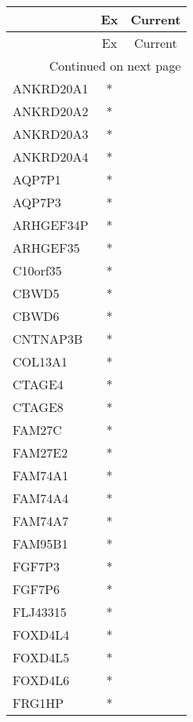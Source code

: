 \begin{longtable}{lcc}
\toprule
{} & Ex & Current \\
\midrule
\endfirsthead

\toprule
{} & Ex & Current \\
\midrule
\endhead
\midrule
\multicolumn{3}{r}{{Continued on next page}} \\
\midrule
\endfoot

\bottomrule
\endlastfoot
ANKRD20A1          &  * &         \\
ANKRD20A2          &  * &         \\
ANKRD20A3          &  * &         \\
ANKRD20A4          &  * &         \\
AQP7P1             &  * &         \\
AQP7P3             &  * &         \\
ARHGEF34P          &  * &         \\
ARHGEF35           &  * &         \\
C10orf35           &  * &         \\
CBWD5              &  * &         \\
CBWD6              &  * &         \\
CNTNAP3B           &  * &         \\
COL13A1            &  * &         \\
CTAGE4             &  * &         \\
CTAGE8             &  * &         \\
FAM27C             &  * &         \\
FAM27E2            &  * &         \\
FAM74A1            &  * &         \\
FAM74A4            &  * &         \\
FAM74A7            &  * &         \\
FAM95B1            &  * &         \\
FGF7P3             &  * &         \\
FGF7P6             &  * &         \\
FLJ43315           &  * &         \\
FOXD4L4            &  * &         \\
FOXD4L5            &  * &         \\
FOXD4L6            &  * &         \\
FRG1HP             &  * &         \\

\end{longtable}
